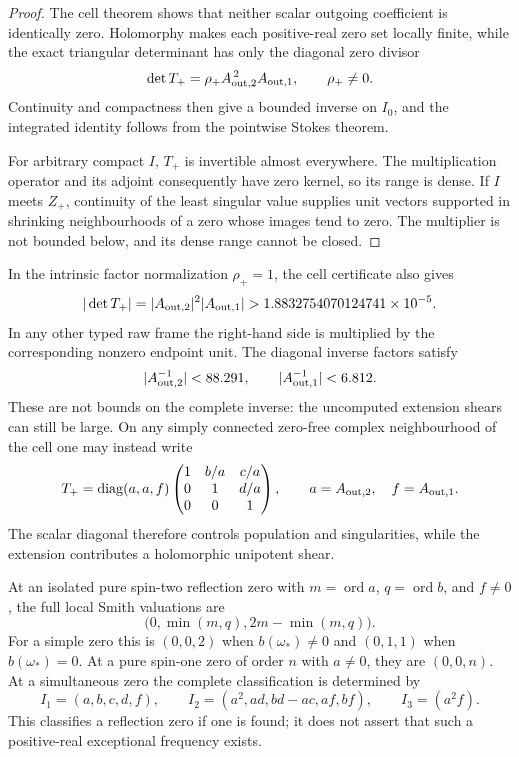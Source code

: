 \documentclass[11pt]{article}
\theoremstyle{definition}
\theoremstyle{remark}
\begin{document}
\begin{proof}
The cell theorem shows that neither scalar outgoing coefficient is
identically zero.  Holomorphy makes each positive-real zero set locally
finite, while the exact triangular determinant has only the diagonal zero
divisor
\[
 \det T_+=\rho_+A_{{\rm out},2}^{\,2}A_{{\rm out},1},
 \qquad \rho_+\ne0.
\]
Continuity and compactness then give a bounded inverse on \(I_0\), and the
integrated identity follows from the pointwise Stokes theorem.

For arbitrary compact \(I\), \(T_+\) is invertible almost everywhere.
The multiplication operator and its adjoint consequently have zero kernel,
so its range is dense.  If \(I\) meets \(Z_+\), continuity of the least
singular value supplies unit vectors supported in shrinking neighbourhoods
of a zero whose images tend to zero.  The multiplier is not bounded below,
and its dense range cannot be closed.
\end{proof}

In the intrinsic factor normalization \(\rho_+=1\), the cell certificate
also gives
\[
 |\det T_+|
 =
 |A_{{\rm out},2}|^2|A_{{\rm out},1}|
 >
 1.8832754070124741\times10^{-5}.
\]
In any other typed raw frame the right-hand side is multiplied by the
corresponding nonzero endpoint unit.  The diagonal inverse factors satisfy
\[
 |A_{{\rm out},2}^{-1}|<88.291,\qquad
 |A_{{\rm out},1}^{-1}|<6.812.
\]
These are not bounds on the complete inverse: the uncomputed extension
shears can still be large.  On any simply connected zero-free complex
neighbourhood of the cell one may instead write
\[
 T_+=
 \operatorname{diag}(a,a,f)
 \begin{pmatrix}
 1&b/a&c/a\\
 0&1&d/a\\
 0&0&1
 \end{pmatrix},
 \qquad
 a=A_{{\rm out},2},\quad f=A_{{\rm out},1}.
\]
The scalar diagonal therefore controls population and singularities, while
the extension contributes a holomorphic unipotent shear.

At an isolated pure spin-two reflection zero with
\(m=\operatorname{ord}a\), \(q=\operatorname{ord}b\), and \(f\ne0\), the
full local Smith valuations are
\[
 \bigl(0,\min(m,q),2m-\min(m,q)\bigr).
\]
For a simple zero this is \((0,0,2)\) when \(b(\omega_*)\ne0\) and
\((0,1,1)\) when \(b(\omega_*)=0\).  At a pure spin-one zero of order \(n\)
with \(a\ne0\), they are \((0,0,n)\).  At a simultaneous zero the complete
classification is determined by
\[
 I_1=(a,b,c,d,f),\qquad
 I_2=(a^2,ad,bd-ac,af,bf),\qquad
 I_3=(a^2f).
\]
This classifies a reflection zero if one is found; it does not assert that
such a positive-real exceptional frequency exists.
\end{document}
